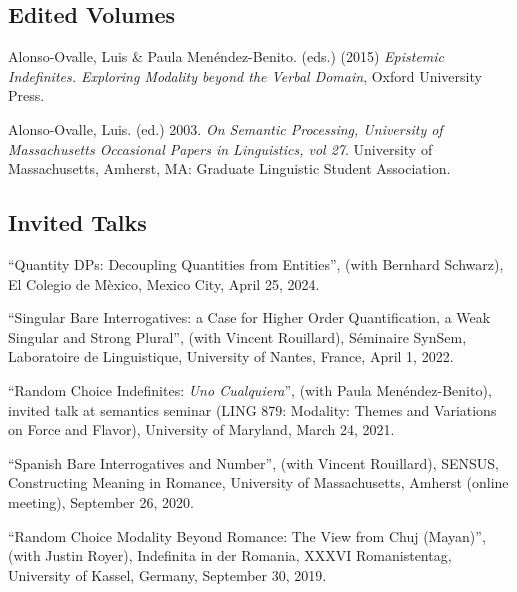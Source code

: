 \documentclass[11pt]{article}
\begin{document}

\subsection*{Edited Volumes}

Alonso-Ovalle, Luis \& Paula Men\'endez-Benito. (eds.) (2015) \emph{Epistemic Indefinites. Exploring Modality beyond the Verbal Domain}, Oxford University Press.

Alonso-Ovalle, Luis. (ed.) 2003. \emph{On Semantic Processing, University of Massachusetts Occasional Papers in Linguistics, vol 27}. University of Massachusetts, Amherst, MA: Graduate Linguistic Student Association.


\subsection*{Invited Talks}

``Quantity DPs: Decoupling Quantities from Entities'', (with Bernhard Schwarz), El Colegio de M\`exico, Mexico City, April 25, 2024.

``Singular Bare Interrogatives: a Case for Higher Order Quantification, a Weak Singular and Strong Plural'', (with Vincent Rouillard), S\'eminaire SynSem, Laboratoire de Linguistique, University of Nantes, France, April 1, 2022.

``Random Choice Indefinites: \textit{Uno Cualquiera}'', (with Paula Men\'endez-Benito), invited talk at semantics seminar (LING 879: Modality: Themes and Variations on Force and Flavor), University of Maryland, March 24, 2021.

``Spanish Bare Interrogatives and Number'', (with Vincent Rouillard), SENSUS, Constructing Meaning in Romance, University of Massachusetts, Amherst (online meeting), September 26, 2020.

``Random Choice Modality Beyond Romance: The View from Chuj (Mayan)'', (with Justin Royer), Indefinita in der Romania, XXXVI Romanistentag, University of Kassel, Germany, September 30, 2019.
\end{document}
